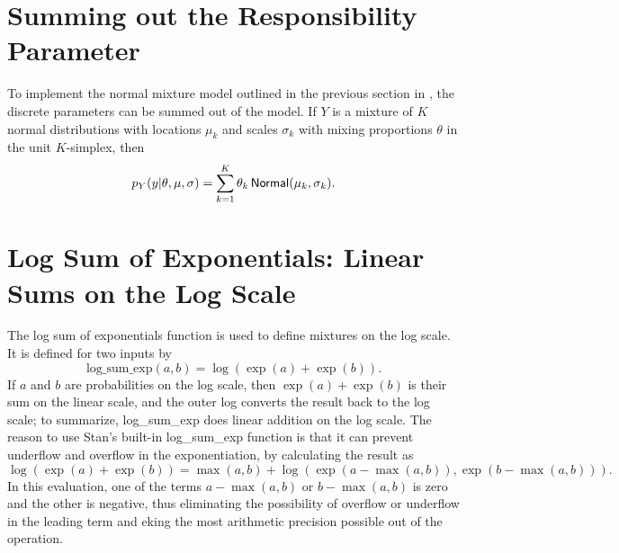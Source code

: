 \section{Summing out the Responsibility Parameter}

To implement the normal mixture model outlined in the previous
section in \Stan, the discrete parameters can be summed out of the
model. If $Y$ is a mixture of $K$ normal distributions with 
locations $\mu_k$ and scales $\sigma_k$ with mixing proportions
$\theta$ in the unit $K$-simplex, then 
\[
p_Y(y | \theta,\mu,\sigma) = \sum_{k=1}^K \theta_k \, \distro{Normal}(\mu_k,\sigma_k).
\]

\section{Log Sum of Exponentials: Linear Sums on the Log Scale}

The log sum of exponentials function is used to define mixtures on the
log scale.  It is defined for two inputs by
%
\[
\mbox{log\_sum\_exp}(a,b) = \log (\exp(a) + \exp(b)).
\]
%
If $a$ and $b$ are probabilities on the log scale, then $\exp(a) +
\exp(b)$ is their sum on the linear scale, and the outer log converts
the result back to the log scale; to summarize, log\_sum\_exp does
linear addition on the log scale.   The reason to use Stan's built-in
log\_sum\_exp function is that it can prevent underflow and overflow
in the exponentiation, by calculating the result as
%
\[
\log(\exp(a) + \exp(b))
= \max(a,b) + \log(\exp(a - \max(a,b)), \exp(b - \max(a,b))).
\]
%
In this evaluation, one of the terms $a - \max(a,b)$ or $b -
\max(a,b)$ is zero and the other is negative, thus eliminating the
possibility of overflow or underflow in the leading term and eking the
most arithmetic precision possible out of the operation.


